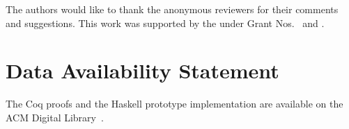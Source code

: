\documentclass[acmsmall]{acmart}
\newcommand{\scw}[1]{}
\newcommand{\jc}[1]{}
\newcommand{\jws}[1]{}
\begin{document}



\begin{acks} 
The authors would like to thank the anonymous reviewers for their comments and suggestions.
This work was supported by the  under Grant Nos.~ and
.
\end{acks}

\section*{Data Availability Statement}
The Coq proofs and the Haskell prototype implementation are
available on the ACM Digital Library~\citep{dcoiartifact}.





\scw{TODO (later): revise proofs to only require semilattice, not lattice}
\jws{TODO (later): do you all prefer Section rather than $\S$?}
\jc{TODO (never): we should really be using `\\cref' for this :p}
\jws{TODO (later): I think the names of the defeq rules are still based on the old conventions (e.g. GE, CGE)}



\end{document}
